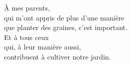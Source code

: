 \documentclass[../thesis.tex]{subfiles}
\begin{document}
\thispagestyle{empty}
{}

\null %

\vfill

\begin{otherlanguage}{french}
  \begin{center}
    À mes parents, \\
    qui m'ont appris de plus d'une manière \\
    que planter des graines, c'est important. \\
    \bigskip
    Et à tous ceux \\
    qui, à leur manière aussi, \\
    contribuent à cultiver notre jardin.
  \end{center}

\end{otherlanguage}

\vfill
\end{document}
